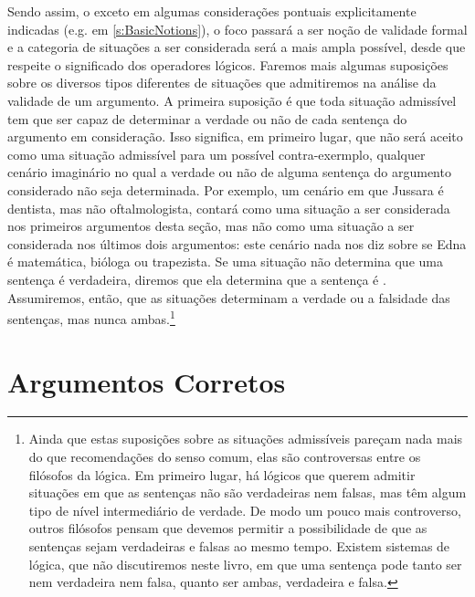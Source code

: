 


Sendo assim, o exceto em algumas considerações pontuais explicitamente indicadas (e.g. em \ref{s:BasicNotions}), o foco passará a ser noção de validade formal e a categoria de situações a ser considerada será a mais ampla possível, desde que respeite o significado dos operadores lógicos. 
Faremos mais algumas suposições sobre os diversos tipos diferentes de situações que admitiremos na análise da validade de um argumento.
A primeira suposição é que toda situação admissível tem que ser capaz de determinar a verdade ou não de cada sentença do argumento em consideração.
Isso significa, em primeiro lugar, que não será aceito como uma situação admissível para um possível contra-exermplo, qualquer cenário imaginário no qual a verdade ou não de alguma sentença do argumento considerado não seja determinada.
Por exemplo, um cenário em que Jussara é dentista, mas não oftalmologista, contará como uma situação a ser considerada nos primeiros argumentos desta seção, mas não como uma situação a ser considerada nos últimos dois argumentos:
este cenário nada nos diz sobre se Edna é matemática, bióloga ou trapezista.
Se uma situação não determina que uma sentença é verdadeira, diremos que ela determina que a sentença é .
Assumiremos, então, que as situações determinam a verdade ou a falsidade das sentenças, mas nunca ambas.\footnote{
	Ainda que estas suposições sobre as situações admissíveis pareçam nada mais do que recomendações do senso comum, elas são controversas entre os filósofos da lógica.
Em primeiro lugar, há lógicos que querem admitir situações em que as sentenças não são verdadeiras nem falsas, mas têm algum tipo de nível intermediário de verdade.
De modo um pouco mais controverso, outros filósofos pensam que devemos permitir a possibilidade de que as sentenças sejam verdadeiras e falsas ao mesmo tempo. Existem sistemas de lógica, que não discutiremos neste livro, em que uma sentença pode tanto ser nem verdadeira nem falsa, quanto ser ambas, verdadeira e falsa.}


\section{Argumentos Corretos}

